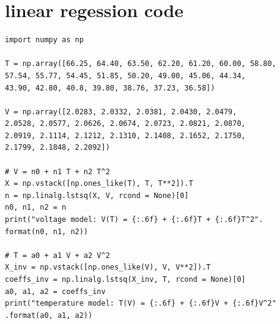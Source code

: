 \documentclass[journal]{IEEEtran}
\begin{document}
\section*{\large{linear regession code}}

\begin{verbatim}
import numpy as np

T = np.array([66.25, 64.40, 63.50, 62.20, 61.20, 60.00, 58.80,
57.54, 55.77, 54.45, 51.85, 50.20, 49.00, 45.06, 44.34,
43.90, 42.80, 40.8, 39.80, 38.76, 37.23, 36.58])

V = np.array([2.0283, 2.0332, 2.0381, 2.0430, 2.0479,
2.0528, 2.0577, 2.0626, 2.0674, 2.0723, 2.0821, 2.0870,
2.0919, 2.1114, 2.1212, 2.1310, 2.1408, 2.1652, 2.1750,
2.1799, 2.1848, 2.2092])

# V = n0 + n1 T + n2 T^2
X = np.vstack([np.ones_like(T), T, T**2]).T
n = np.linalg.lstsq(X, V, rcond = None)[0]
n0, n1, n2 = n
print("voltage model: V(T) = {:.6f} + {:.6f}T + {:.6f}T^2".
format(n0, n1, n2))

# T = a0 + a1 V + a2 V^2
X_inv = np.vstack([np.ones_like(V), V, V**2]).T
coeffs_inv = np.linalg.lstsq(X_inv, T, rcond = None)[0]
a0, a1, a2 = coeffs_inv
print("temperature model: T(V) = {:.6f} + {:.6f}V + {:.6f}V^2"
.format(a0, a1, a2))
\end{verbatim}
\end{document}
